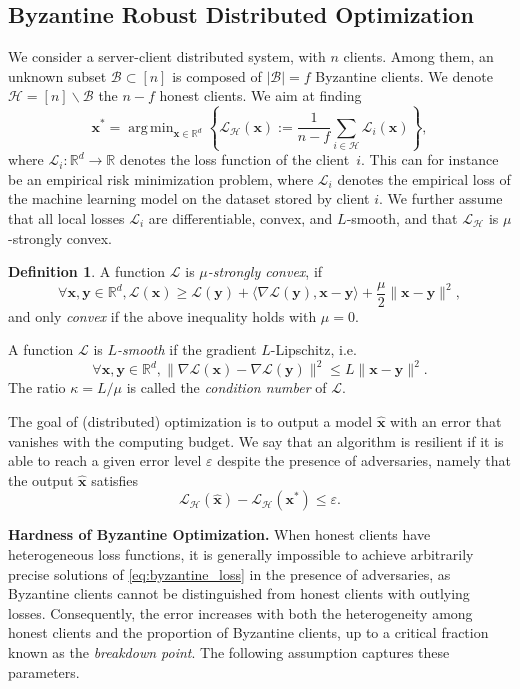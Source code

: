 \documentclass{article}
\def\eps{{\varepsilon}}
\def\vx{{\bm{x}}}
\def\vy{{\bm{y}}}
\newcommand{\R}{\mathbb{R}}
\DeclareMathOperator*{\argmin}{arg\,min}
\newcommand{\cB}{\mathcal{B}}
\newcommand{\cH}{\mathcal{H}}
\newcommand{\cL}{\mathcal{L}}
\theoremstyle{plain}
\theoremstyle{definition}
\newtheorem{definition}[theorem]{Definition}
\theoremstyle{remark}
\begin{document}
\subsection{Byzantine Robust Distributed Optimization}
\label{subsec:setup}
We consider a server-client distributed system, with $n$ clients. Among them, an unknown subset $\cB \subset [n]$ is composed of $|\cB| = f$ Byzantine clients. We denote $\cH = [n]\backslash \cB$ the $n-f$ honest clients. We aim at finding 
\begin{equation}
\label{eq:byzantine_loss}
    \vx^* =\argmin_{\vx\in\R^d}\left \{ \cL_{\cH}(\vx) := \frac{1}{n-f}\sum_{i \in \cH}\cL_i(\vx)\right\},
\end{equation}
where $\cL_i : \R^d \rightarrow \R$ denotes the loss function of the client~$i$. This can for instance be an empirical risk minimization problem, where $\cL_i$ denotes the empirical loss of the machine learning model on the dataset stored by client $i$. We further assume that all local losses $\cL_i$ are differentiable, convex, and $L$-smooth, and that $\cL_{\cH}$ is $\mu$-strongly convex.
\begin{definition}
\label{def:strong_convexity_and_smoothness}
A function $\cL$ is $\mu$\textit{-strongly convex}, if
    \[
    \forall \vx,\vy \in \R^d, \cL(\vx) \ge \cL(\vy) + \langle  \nabla \cL(\vy), \vx-\vy\rangle + \frac{\mu}{2}\|\vx - \vy\|^2,
    \]
and only \textit{convex} if the above inequality holds with $\mu=0$.

A function $\cL$ is $L$\textit{-smooth} if the gradient $L$-Lipschitz, i.e.
$$\forall \vx,\vy\in \R^d, \|\nabla \cL(\vx) - \nabla \cL(\vy)\|^2 \le L\|\vx-\vy\|^2.$$
The ratio $\kappa = L/\mu$ is called the \emph{condition number} of $\cL$.
\end{definition}

The goal of (distributed) optimization is to output a model $\hat{\vx}$ with an error that vanishes with the computing budget. We say that an algorithm is resilient if it is able to reach a given error level $\eps$ despite the presence of adversaries, namely that the output $\hat{\vx}$ satisfies
\[
\cL_{\cH}(\hat{\vx}) - \cL_{\cH}(\vx^*) \le \eps.
\]


\textbf{Hardness of Byzantine Optimization.}
When honest clients have heterogeneous loss functions, it is generally impossible to achieve arbitrarily precise solutions of \cref{eq:byzantine_loss} in the presence of adversaries, as Byzantine clients cannot be distinguished from honest clients with outlying losses. Consequently, the error increases with both the heterogeneity among honest clients and the proportion of Byzantine clients, up to a critical fraction known as the\textit{ breakdown point}. The following assumption captures these parameters.
\end{document}
